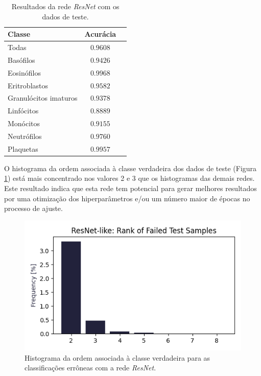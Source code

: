 \documentclass[final,5p]{elsarticle}
\numberwithin{equation}{section}
\begin{document}
    \begin{table}[h]
        \centering
        \begin{tabular}{l c c}
            \toprule
            \textbf{Classe} & \textbf{Acurácia} \\
            \midrule
            Todas & $0.9608$ \\
            \addlinespace
            Basófilos  & $0.9426$ \\
            Eosinófilos  & $0.9968$ \\
            Eritroblastos  & $0.9582$ \\
            Granulócitos imaturos  & $0.9378$ \\
            Linfócitos  & $0.8889$ \\
            Monócitos  & $0.9155$ \\
            Neutrófilos  & $0.9760$ \\
            Plaquetas  & $0.9957$ \\
            \bottomrule
        \end{tabular}
        \caption{Resultados da rede \emph{ResNet} com os dados de teste.}\label{tab:ResultadosResNet}
    \end{table}

    O histograma da ordem associada à classe verdadeira dos dados de teste (Figura \ref{fig:HistogramaErrosResNet}) está mais concentrado nos valores 2 e 3 que os histogramas das demais redes. Este resultado indica que esta rede tem potencial para gerar melhores resultados por uma otimização dos hiperparâmetros e/ou um número maior de épocas no processo de ajuste.

    \begin{figure}[hbt!]
        \includegraphics[width=0.95\columnwidth]{ResNet_rank.png}
        \caption{Histograma da ordem associada à classe verdadeira para as classificações errôneas com a rede \emph{ResNet}.}\label{fig:HistogramaErrosResNet}
    \end{figure}
\end{document}
